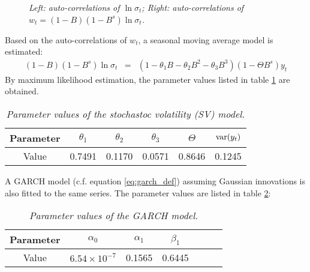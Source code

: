 \begin{figure}[htb!]
  \centering
  \caption{\small \it Left: auto-correlations of $\ln \sigma_t$;
    Right: auto-correlations of $w_t = (1-B)(1-B^s) \ln \sigma_t$.}
\end{figure}

Based on the auto-correlations of $w_t$, a seasonal moving average
model is estimated:
\begin{eqnarray*}
  (1-B)(1-B^s) \ln\sigma_t &=& (1-\theta_1B - \theta_2B^2 - \theta_3
  B^3)(1 - \Theta B^s)y_t
\end{eqnarray*}
By maximum likelihood estimation, the parameter values listed in table
\ref{tab:volvo_15_sv_param} are obtained.
\begin{table}[htb!]
  \centering
  \begin{tabular}{|c|c|c|c|c|c|}
  \hline
  Parameter & $\theta_1$ & $\theta_2$ & $\theta_3$ & $\Theta$ & 
 $\text{var}(y_t)$ \\
 \hline
 Value & 0.7491 & 0.1170 & 0.0571 & 0.8646 & 0.1245 \\
  \hline
  \end{tabular}
  \caption{\small \it Parameter values of the stochastoc volatility
    (SV) model.}
  \label{tab:volvo_15_sv_param}
\end{table}

A GARCH model (c.f. equation \ref{eq:garch_def}) assuming Gaussian
innovations is also fitted to the same series. The parameter values
are listed in table \ref{tab:volvo_15_garch_param}:
\begin{table}[htb!]
  \centering
  \begin{tabular}{|c|c|c|c|c|c|c|}
  \hline
  Parameter & $\alpha_0$ & $\alpha_1$ & $\beta_{1}$ \\
  \hline
  Value & $6.54 \times 10^{-7}$ & 0.1565 & 0.6445\\
  \hline
  \end{tabular}
  \caption{\small \it Parameter values of the GARCH model.}
  \label{tab:volvo_15_garch_param}
\end{table}

